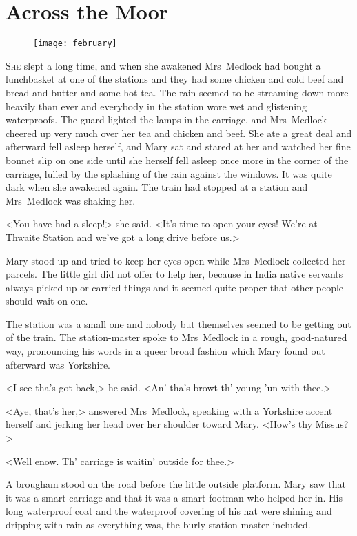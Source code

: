 \chapter{Across the Moor} 
	
\begin{figure}[t!]
\centering
\texttt{[image: february]}
\end{figure}

 \lettrine[]{S}{he} slept a long time, and when she awakened Mrs~Medlock had bought a lunchbasket at one of the stations and they had some chicken and cold beef and bread and butter and some hot tea. The rain seemed to be streaming down more heavily than ever and everybody in the station wore wet and glistening waterproofs. The guard lighted the lamps in the carriage, and Mrs~Medlock cheered up very much over her tea and chicken and beef. She ate a great deal and afterward fell asleep herself, and Mary sat and stared at her and watched her fine bonnet slip on one side until she herself fell asleep once more in the corner of the carriage, lulled by the splashing of the rain against the windows. It was quite dark when she awakened again. The train had stopped at a station and Mrs~Medlock was shaking her.

<You have had a sleep!> she said. <It's time to open your eyes! We're at Thwaite Station and we've got a long drive before us.>

Mary stood up and tried to keep her eyes open while Mrs~Medlock collected her parcels. The little girl did not offer to help her, because in India native servants always picked up or carried things and it seemed quite proper that other people should wait on one.

The station was a small one and nobody but themselves seemed to be getting out of the train. The station-master spoke to Mrs~Medlock in a rough, good-natured way, pronouncing his words in a queer broad fashion which Mary found out afterward was Yorkshire.

<I see tha's got back,> he said. <An' tha's browt th' young 'un with thee.>

<Aye, that's her,> answered Mrs~Medlock, speaking with a Yorkshire accent herself and jerking her head over her shoulder toward Mary. <How's thy Missus?>

<Well enow. Th' carriage is waitin' outside for thee.>

A brougham stood on the road before the little outside platform. Mary saw that it was a smart carriage and that it was a smart footman who helped her in. His long waterproof coat and the waterproof covering of his hat were shining and dripping with rain as everything was, the burly station-master included.


